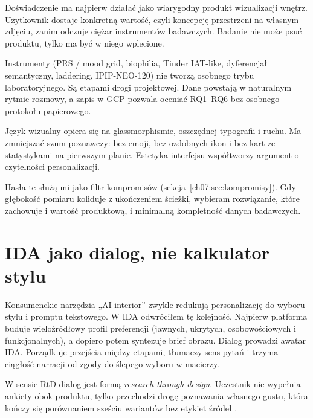 \begin{description}[style=nextline]
  \item[Product-First]
    Doświadczenie ma najpierw działać jako wiarygodny produkt wizualizacji wnętrz. Użytkownik dostaje konkretną wartość, czyli koncepcję przestrzeni na własnym zdjęciu, zanim odczuje ciężar instrumentów badawczych. Badanie nie może psuć produktu, tylko ma być w niego wplecione.
  \item[Research-Embedded]
    Instrumenty (PRS / mood grid, biophilia, Tinder IAT-like, dyferencjał semantyczny, laddering, IPIP-NEO-120) nie tworzą osobnego trybu laboratoryjnego. Są etapami drogi projektowej. Dane powstają w naturalnym rytmie rozmowy, a zapis w GCP pozwala oceniać RQ1--RQ6 bez osobnego protokołu papierowego.
  \item[Minimalist Glass Design]
    Język wizualny opiera się na glassmorphismie, oszczędnej typografii i ruchu. Ma zmniejszać szum poznawczy: bez emoji, bez ozdobnych ikon i bez kart ze statystykami na pierwszym planie. Estetyka interfejsu współtworzy argument o czytelności personalizacji.
\end{description}

Hasła te służą mi jako filtr kompromisów (sekcja~\ref{ch07:sec:kompromisy}). Gdy głębokość pomiaru koliduje z ukończeniem ścieżki, wybieram rozwiązanie, które zachowuje i wartość produktową, i minimalną kompletność danych badawczych.

\section{IDA jako dialog, nie kalkulator stylu}
\label{ch07:sec:dialog}

Konsumenckie narzędzia „AI interior” zwykle redukują personalizację do wyboru stylu i promptu tekstowego. W IDA odwróciłem tę kolejność. Najpierw platforma buduje wieloźródłowy profil preferencji (jawnych, ukrytych, osobowościowych i funkcjonalnych), a dopiero potem syntezuje brief obrazu.
Dialog prowadzi awatar IDA. Porządkuje przejścia między etapami, tłumaczy sens pytań i trzyma ciągłość narracji od zgody do ślepego wyboru w macierzy.

W sensie RtD dialog jest formą \emph{research through design}. Uczestnik nie wypełnia ankiety obok produktu, tylko przechodzi drogę poznawania własnego gustu, która kończy się porównaniem sześciu wariantów bez etykiet źródeł \parencite{zimmerman2007rtd}.

